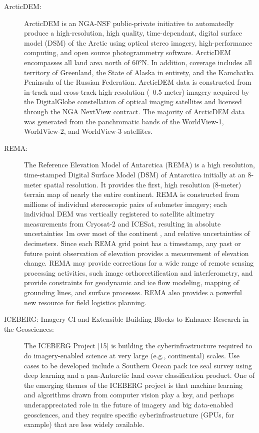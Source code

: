 \documentclass[10pt,letterpaper,draft]{article}
\begin{document}
\begin{description}
  \item [ArcticDEM:] ArcticDEM is an NGA-NSF public-private initiative to automatedly produce a high-resolution, high quality, time-dependant, digital surface model (DSM) of the Arctic using optical stereo imagery, high-performance computing, and open source photogrammetry software. ArcticDEM encompasses all land area north of 60°N. In addition, coverage includes all territory of Greenland, the State of Alaska in entirety, and the Kamchatka Peninsula of the Russian Federation. ArcticDEM data is constructed from in-track and cross-track high-resolution (~0.5 meter) imagery acquired by the DigitalGlobe constellation of optical imaging satellites and licensed through the NGA NextView contract. The majority of ArcticDEM data was generated from the panchromatic bands of the WorldView-1, WorldView-2, and WorldView-3 satellites. 
  
  \item [REMA:] The Reference Elevation Model of Antarctica (REMA) is a high resolution, time-stamped Digital Surface Model (DSM) of Antarctica initially at an 8-meter spatial resolution. It provides the first, high resolution (8-meter) terrain map of nearly the entire continent. REMA is constructed from millions of individual stereoscopic pairs of submeter imagery; each individual DEM was vertically registered to satellite altimetry measurements from Cryosat-2 and ICESat, resulting in absolute uncertainties   1m over most of the continent , and relative uncertainties of decimeters. Since each REMA grid point has a timestamp, any past or future point observation of elevation provides a measurement of elevation change. REMA may provide corrections for a wide range of remote sensing processing activities, such image orthorectification and interferometry, and provide constraints for geodynamic and ice flow modeling, mapping of grounding lines, and surface processes. REMA also provides a powerful new resource for field logistics planning.

\item [ICEBERG: Imagery CI and Extensible Building-Blocks to Enhance Research in the Geosciences:]                                           
The ICEBERG Project [15] is building the cyberinfrastructure required to do imagery-enabled science at very large (e.g., continental) scales. Use cases to be developed include a Southern Ocean pack ice seal survey using deep learning and a pan-Antarctic land cover classification product. One of the emerging themes of the ICEBERG project is that machine learning and algorithms drawn from computer vision play a key, and perhaps underappreciated role in the future of imagery and big data-enabled geosciences, and they require specific cyberinfrastructure (GPUs, for example) that are less widely available.
 

\end{description}
\end{document}
